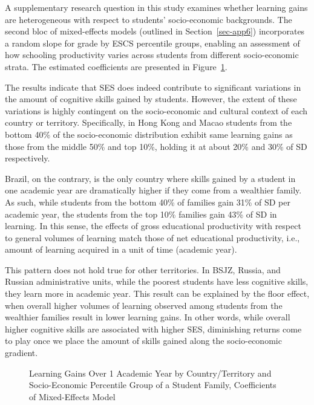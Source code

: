 \documentclass[
]{article}
\begin{document}
A supplementary research question in this study examines whether
learning gains are heterogeneous with respect to students'
socio-economic backgrounds. The second bloc of mixed-effects models
(outlined in Section~\ref{sec-app6}) incorporates a random slope for
grade by ESCS percentile groups, enabling an assessment of how schooling
productivity varies across students from different socio-economic
strata. The estimated coefficients are presented in Figure~\ref{fig-m2}.

The results indicate that SES does indeed contribute to significant
variations in the amount of cognitive skills gained by students.
However, the extent of these variations is highly contingent on the
socio-economic and cultural context of each country or territory.
Specifically, in Hong Kong and Macao students from the bottom 40\% of
the socio-economic distribution exhibit same learning gains as those
from the middle 50\% and top 10\%, holding it at about 20\% and 30\% of
SD respectively.

Brazil, on the contrary, is the only country where skills gained by a
student in one academic year are dramatically higher if they come from a
wealthier family. As such, while students from the bottom 40\% of
families gain 31\% of SD per academic year, the students from the top
10\% families gain 43\% of SD in learning. In this sense, the effects of
gross educational productivity with respect to general volumes of
learning match those of net educational productivity, i.e., amount of
learning acquired in a unit of time (academic year).

This pattern does not hold true for other territories. In BSJZ, Russia,
and Russian administrative units, while the poorest students have less
cognitive skills, they learn more in academic year. This result can be
explained by the floor effect, when overall higher volumes of learning
observed among students from the wealthier families result in lower
learning gains. In other words, while overall higher cognitive skills
are associated with higher SES, diminishing returns come to play once we
place the amount of skills gained along the socio-economic gradient.

\begin{figure}


\caption{\label{fig-m2}Learning Gains Over 1 Academic Year by
Country/Territory and Socio-Economic Percentile Group of a Student
Family, Coefficients of Mixed-Effects Model}

\end{figure}%
\end{document}
